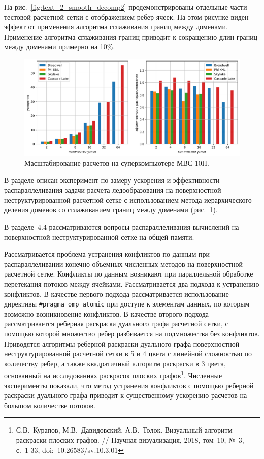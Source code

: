 \documentclass[a4paper,14pt]{extarticle}                     %
\theoremstyle{plain}                                         %
\begin{document}
На рис.~\ref{fig:text_2_smooth_decomp2} продемонстрированы отдельные части тестовой расчетной сетки с отображением ребер ячеек.
На этом рисунке виден эффект от применения алгоритма сглаживания границ между доменами.
Применение алгоритма сглаживания границ приводит к сокращению длин границ между доменами примерно на 10\%.

\begin{figure}[!ht]
\centering
\includegraphics[width=1.0\textwidth]{pics/text_2_scaling/2in1.png}
\singlespacing
\caption{Масштабирование расчетов на суперкомпьютере МВС-10П.}
\label{fig:text_2_scaling_speedup_eff}
\end{figure}

В разделе описан эксперимент по замеру ускорения и эффективности распараллеливания задачи расчета ледообразования на поверхностной неструктурированной расчетной сетке с использованием метода иерархического деления доменов со сглаживанием границ между доменами (рис.~\ref{fig:text_2_scaling_speedup_eff}).


В разделе~4.4 рассматриваются вопросы распараллеливания вычислений на поверхностной неструктурированной сетке на общей памяти.

Рассматривается проблема устранения конфликтов по данным при распараллеливании конечно-объемных численных методов на поверхностной расчетной сетке.
Конфликты по данным возникают при параллельной обработке перетекания потоков между ячейками.
Рассматривается два подхода к устранению конфликтов.
В качестве первого подхода рассматривается использование директивы \texttt{\#pragma omp atomic} при доступе к элементам данных, по которым возможно возникновение конфликтов.
В качестве второго подхода рассматривается реберная раскраска дуального графа расчетной сетки, с помощью которой множество ребер разбивается на подмножества без конфликтов.
Приводятся алгоритмы реберной раскраски дуального графа поверхностной неструктурированной расчетной сетки в 5 и 4 цвета с линейной сложностью по количеству ребер, а также квадратичный алгоритм раскраски в 3 цвета, основанный на исследованиях раскрасок плоских графов\footnote[4]{С.В.~Курапов, М.В.~Давидовский, А.В.~Толок. Визуальный алгоритм раскраски плоских графов. // Научная визуализация, 2018, том~10, №~3, с.~1-33, doi:~10.26583/sv.10.3.01}.
Численные эксперименты показали, что метод устранения конфликтов с помощью реберной раскраски дуального графа приводит к существенному ускорению расчетов на большом количестве потоков.
\end{document}
